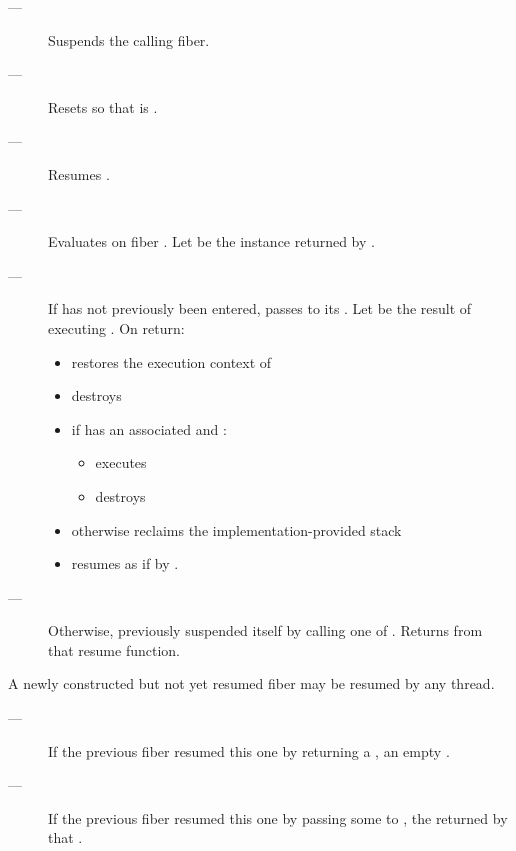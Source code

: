 \effects
\begin{description}
    \item[---] Suspends the calling fiber.
    \item[---] Resets \state so that \emptyfn is \true.
    \item[---] Resumes .
    \item[---] Evaluates 
               on fiber .
               Let  be the \fiber instance returned by .
    \item[---] If  has not previously been
               entered, passes  to its \entryfn. Let \continuation
               be the result of executing
               . On return:
        \begin{itemize}
            \item restores the execution context of \continuation
            \item destroys 
            \item if  has an associated  and :
                \begin{itemize}
                    \item executes 
                    \item destroys 
                \end{itemize}
            \item otherwise reclaims the implementation-provided stack
            \item resumes \continuation as if by .
        \end{itemize}
    \item[---] Otherwise,  previously
               suspended itself by calling one of \anyresume.
               Returns  from that resume function.
\end{description}

\remarks
A newly constructed but not yet resumed fiber may be resumed by
any thread.

\returns
\begin{description}
    \item[---] If the previous fiber resumed this one by returning a \fiber,
               an empty \fiber.
    \item[---] If the previous fiber resumed this one by passing some 
               to \anyresumewith, the \fiber returned by that .
\end{description}


